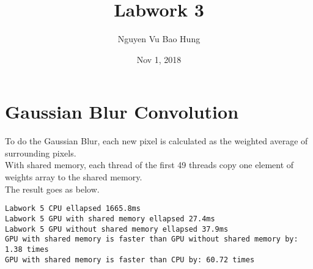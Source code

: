 \documentclass{article}
\title{Labwork 3}
\author{Nguyen Vu Bao Hung}
\date{Nov 1, 2018}
\begin{document}
\maketitle

\section{Gaussian Blur Convolution}
To do the Gaussian Blur, each new pixel is calculated as the weighted average of surrounding pixels.\\
With shared memory, each thread of the first 49 threads copy one element of weights array to the shared memory.\\
The result goes as below.
\begin{verbatim}
Labwork 5 CPU ellapsed 1665.8ms
Labwork 5 GPU with shared memory ellapsed 27.4ms
Labwork 5 GPU without shared memory ellapsed 37.9ms
GPU with shared memory is faster than GPU without shared memory by: 1.38 times
GPU with shared memory is faster than CPU by: 60.72 times
\end{verbatim}
\end{document}
